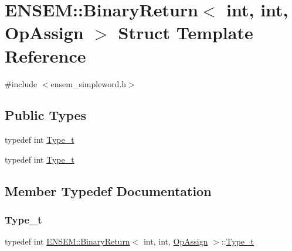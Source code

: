 \hypertarget{structENSEM_1_1BinaryReturn_3_01int_00_01int_00_01OpAssign_01_4}{}\section{E\+N\+S\+EM\+:\+:Binary\+Return$<$ int, int, Op\+Assign $>$ Struct Template Reference}
\label{structENSEM_1_1BinaryReturn_3_01int_00_01int_00_01OpAssign_01_4}


{\ttfamily \#include $<$ensem\+\_\+simpleword.\+h$>$}

\subsection*{Public Types}
\begin{DoxyCompactItemize}
\item 
typedef int \mbox{\hyperlink{structENSEM_1_1BinaryReturn_3_01int_00_01int_00_01OpAssign_01_4_a9190cc9e0398fc2b905dca61a8089bf3}{Type\+\_\+t}}
\item 
typedef int \mbox{\hyperlink{structENSEM_1_1BinaryReturn_3_01int_00_01int_00_01OpAssign_01_4_a9190cc9e0398fc2b905dca61a8089bf3}{Type\+\_\+t}}
\end{DoxyCompactItemize}


\subsection{Member Typedef Documentation}
\mbox{\label{structENSEM_1_1BinaryReturn_3_01int_00_01int_00_01OpAssign_01_4_a9190cc9e0398fc2b905dca61a8089bf3}} 
\subsubsection{\texorpdfstring{Type\_t}{Type\_t}\hspace{0.1cm}{\footnotesize\ttfamily [1/2]}}
{\footnotesize\ttfamily typedef int \mbox{\hyperlink{structENSEM_1_1BinaryReturn}{E\+N\+S\+E\+M\+::\+Binary\+Return}}$<$ int, int, \mbox{\hyperlink{structENSEM_1_1OpAssign}{Op\+Assign}} $>$\+::\mbox{\hyperlink{structENSEM_1_1BinaryReturn_3_01int_00_01int_00_01OpAssign_01_4_a9190cc9e0398fc2b905dca61a8089bf3}{Type\+\_\+t}}}

